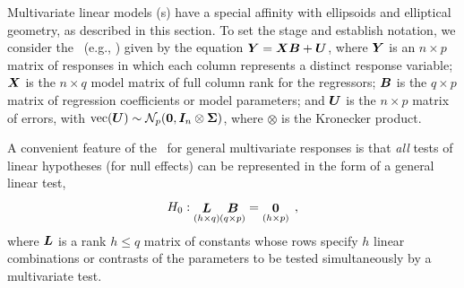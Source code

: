 


Multivariate linear models (\MLM{}s) have a special affinity with ellipsoids and elliptical geometry,
as described in this section.  To set the stage and establish notation, we consider
the \MLM\ (e.g., \citet{Timm:75}) given by
the equation $\bm{Y}=\bm{XB}+\bm{U}$, where $\bm{Y}$ is an $%
n\times p$ matrix of responses in which each column represents a distinct
response variable; $\bm{X}$ is the  $n\times q$ model matrix of full
column rank for the regressors; $\bm{B}$ is the $q \times p$ matrix
of regression coefficients or model parameters; and $\bm{U}$ is the $n \times p$
matrix of errors,
with $\textrm{vec}(\bm{U}) \sim \mathcal{N}_p ( \bm{0}, \bm{I}_n \otimes \bm{\Sigma} )$,
where $\otimes$ is the Kronecker product.

A convenient feature of the \MLM\ for general multivariate responses is that
\emph{all} tests of linear hypotheses (for null effects) can be represented in the form of a general
linear test,
\begin{equation}\label{eq:mglt}
H_0 : \mathord{\mathop{\bm{L}}\limits_{(h \times q)}}
\mathord{\mathop{\bm{B}}\limits_{(q \times p)}} =
\mathord{\mathop{\bm{0}}\limits_{(h \times p)}}
\:\: ,
\end{equation}
where $\bm{L}$ is a rank $h \leq q$ matrix of constants whose rows specify
$h$ linear combinations or contrasts
of the parameters to be tested simultaneously
by a multivariate test.

